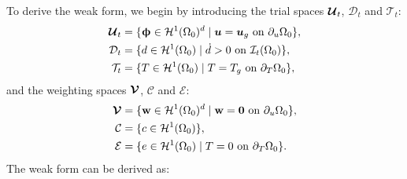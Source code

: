 To derive the weak form, we begin by introducing the trial spaces $\boldsymbol{\mathcal{U}}_t$, $\mathcal{D}_t$ and $\mathcal{T}_t$:
\begin{subequations}
  \begin{align}
    \boldsymbol{\mathcal{U}}_t & = \{ \boldsymbol{\upphi} \in \mathcal{H}^1(\Omega_0)^d \mid \boldsymbol{u} = \boldsymbol{u}_g \text{ on } \partial_u\Omega_0 \}, \\
    \mathcal{D}_t      & = \{ d \in \mathcal{H}^1(\Omega_0) \mid \dot{d} > 0 \text{ on } \mathcal{I}_t(\Omega_0) \},          \\
    \mathcal{T}_t      & = \{ T \in \mathcal{H}^1(\Omega_0) \mid T = T_g \text{ on } \partial_T\Omega_0 \},                   
  \end{align}
\end{subequations}
and the weighting spaces $\boldsymbol{\mathcal{V}}$, $\mathcal{C}$ and $\mathcal{E}$:
\begin{subequations}
  \begin{align}
    \boldsymbol{\mathcal{V}} & = \{ \textbf{w} \in \mathcal{H}^1(\Omega_0)^d \mid \textbf{w} = \boldsymbol{0} \text{ on } \partial_u\Omega_0 \}, \\
    \mathcal{C}      & = \{ c \in \mathcal{H}^1(\Omega_0) \},                                                       \\
    \mathcal{E}      & = \{ e \in \mathcal{H}^1(\Omega_0) \mid T = 0 \text{ on } \partial_T\Omega_0 \}.              
  \end{align}
\end{subequations}
The weak form can be derived as:
